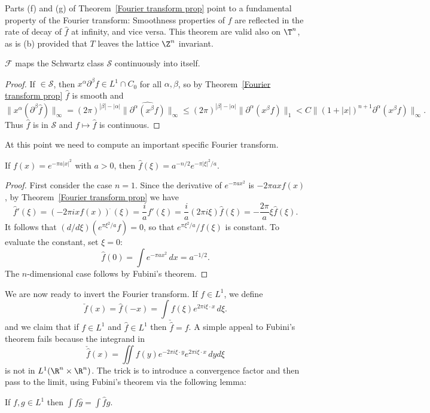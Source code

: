 Parts (f) and (g) of Theorem~\ref{Fourier transform prop} point to a fundamental property of the Fourier transform: Smoothness properties of $f$ are reflected in the rate of decay of $\hat{f}$ at infinity, and vice versa. This theorem are valid also on $\T^n$, as is (b) provided that $T$ leaves the lattice $\Z^n$ invariant.
\begin{corollary}
$\mathcal{F}$ maps the Schwartz class $\mathscr{S}$ continuously into itself.
\end{corollary}
\begin{proof}
If $\in\mathscr{S}$, then $x^\alpha\partial^\beta f\in L^1\cap C_0$ for all $\alpha,\beta$, so by Theorem~\ref{Fourier transform prop} $\hat{f}$ is smooth and
\[\|x^\alpha(\partial^\beta\hat{f})\|_\infty=(2\pi)^{|\beta|-|\alpha|}\|\widehat{\partial^\alpha(x^\beta f)}\|_\infty\leq(2\pi)^{|\beta|-|\alpha|}\|\partial^\alpha(x^\beta f)\|_1<C\|(1+|x|)^{n+1}\partial^\alpha(x^\beta f)\|_\infty.\]
Thus $\hat{f}$ is in $\mathscr{S}$ and $f\mapsto\hat{f}$ is continuous.
\end{proof}
At this point we need to compute an important specific Fourier transform.
\begin{proposition}\label{Fourier transform of e^-pi a|x|^2}
If $f(x)=e^{-\pi a|x|^2}$ with $a>0$, then $\hat{f}(\xi)=a^{-n/2}e^{-\pi|\xi|^2/a}$.
\end{proposition}
\begin{proof}
First consider the case $n=1$. Since the derivative of $e^{-\pi ax^2}$ is $-2\pi axf(x)$, by Theorem~\ref{Fourier transform prop} we have
\[\hat{f}'(\xi)=(-2\pi i xf(x))^{\widehat{\ }}(\xi)=\frac{i}{a}\widehat{f'}(\xi)=\frac{i}{a}(2\pi i\xi)\hat{f}(\xi)=-\frac{2\pi}{a}\xi\hat{f}(\xi).\]
It follows that $(d/d\xi)(e^{\pi\xi^2/a}f)=0$, so that $e^{\pi\xi^2/a}/f(\xi)$ is constant. To evaluate the constant, set $\xi=0$:
\[\hat{f}(0)=\int e^{-\pi ax^2}\,dx=a^{-1/2}.\]
The $n$-dimensional case follows by Fubini's theorem.
\end{proof}
We are now ready to invert the Fourier transform. If $f\in L^1$, we define
\[\check{f}(x)=\hat{f}(-x)=\int f(\xi)e^{2\pi i\xi\cdot x}\,d\xi.\]
and we claim that if $f\in L^1$ and $\hat{f}\in L^1$ then $\check{\hat{f}}=f$. A simple appeal to Fubini's theorem fails because the integrand in
\[\check{\hat{f}}(x)=\iint f(y)e^{-2\pi i\xi\cdot y}e^{2\pi i\xi\cdot x}\,dyd\xi\]
is not in $L^1(\R^n\times\R^n)$. The trick is to introduce a convergence factor and then pass to the limit, using Fubini's theorem via the following lemma:
\begin{lemma}\label{Fourier inverse lemma}
If $f,g\in L^1$ then $\int f\hat{g}=\int \hat{f}g$.
\end{lemma}
